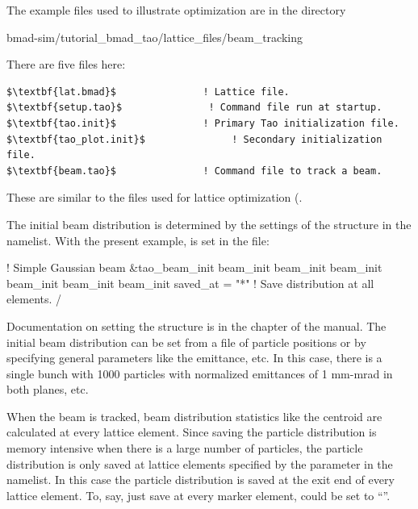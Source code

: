 \documentclass{hitec}     %
\begin{document}
{The example files used to illustrate optimization are in the directory 
\begin{code}
bmad-sim/tutorial_bmad_tao/lattice_files/beam_tracking
\end{code}
There are five files here:
\begin{lstlisting}[mathescape]
$\textbf{lat.bmad}$               ! Lattice file.
$\textbf{setup.tao}$               ! Command file run at startup.
$\textbf{tao.init}$               ! Primary Tao initialization file.
$\textbf{tao_plot.init}$               ! Secondary initialization file.
$\textbf{beam.tao}$               ! Command file to track a beam.
\end{lstlisting}
These are similar to the files used for lattice optimization (.

The initial beam distribution is determined by the settings of the  
structure in the  namelist. With the present example,  is 
set in the  file:
\begin{code}
! Simple Gaussian beam 
&tao_beam_init
  beam_init%
  beam_init%
  beam_init%
  beam_init%
  beam_init%
  beam_init%
  saved_at =  "*"                 ! Save distribution at all elements. 
/
\end{code}
Documentation on setting the  structure is in the  
chapter of the \bmad manual. The initial beam distribution can be set from a file of
particle positions or by specifying general parameters like the emittance, etc. In this case,
there is a single bunch with 1000 particles with normalized emittances of 1 mm-mrad in both
planes, etc. 

When the beam is tracked, beam distribution statistics like the centroid are calculated at every
lattice element. Since saving the particle distribution is memory intensive when there is a large
number of particles, the particle distribution is only saved at lattice elements specified
by the  parameter in the  namelist. In this case the 
particle distribution is saved at the exit end of every lattice element. To, say, just save
at every marker element,  could be set to ``''.

}
\end{document}
